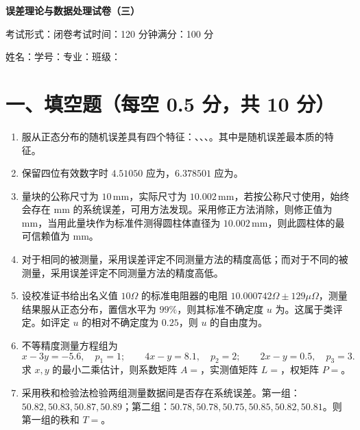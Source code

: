 \documentclass[UTF8,12pt,a4paper]{ctexart}
\newcommand{\blank}[1][2.4cm]{\underline{\hspace{#1}}}
\begin{document}
\begin{center}
    {\bfseries 误差理论与数据处理试卷（三）}\par
    \vspace{0.8em}
    考试形式：闭卷\quad 考试时间：120 分钟\quad 满分：100 分
\end{center}
\vspace{0.3em}
\noindent 姓名：\blank[2cm]\quad 学号：\blank[2.5cm]\quad 专业：\blank[2.5cm]\quad 班级：\blank[2cm]
\vspace{0.6em}

\section*{一、填空题（每空 0.5 分，共 10 分）}
\begin{enumerate}[label=\arabic*、]
\item 服从正态分布的随机误差具有四个特征：\blank[1.8cm]、\blank[1.8cm]、\blank[1.8cm]、\blank[1.8cm]。其中\blank[1.8cm]是随机误差最本质的特征。
\item 保留四位有效数字时 $4.51050$ 应为\blank[1.6cm]，$6.378501$ 应为\blank[1.6cm]。
\item 量块的公称尺寸为 $10\,\mathrm{mm}$，实际尺寸为 $10.002\,\mathrm{mm}$，若按公称尺寸使用，始终会存在\blank[1.6cm] $\mathrm{mm}$ 的系统误差，可用\blank[1.8cm]方法发现。采用修正方法消除，则修正值为\blank[1.6cm] $\mathrm{mm}$，当用此量块作为标准件测得圆柱体直径为 $10.002\,\mathrm{mm}$，则此圆柱体的最可信赖值为\blank[1.6cm] $\mathrm{mm}$。
\item 对于相同的被测量，采用\blank[1.5cm]误差评定不同测量方法的精度高低；而对于不同的被测量，采用\blank[1.5cm]误差评定不同测量方法的精度高低。
\item 设校准证书给出名义值 $10\Omega$ 的标准电阻器的电阻 $10.000742\Omega\pm129\mu\Omega$，测量结果服从正态分布，置信水平为 $99\%$，则其标准不确定度 $u$ 为\blank[1.8cm]。这属于\blank[1cm]类评定。如评定 $u$ 的相对不确定度为 $0.25$，则 $u$ 的自由度为\blank[1cm]。
\item 不等精度测量方程组为
\begin{equation*}
    x-3y=-5.6,\quad p_1=1;\qquad
    4x-y=8.1,\quad p_2=2;\qquad
    2x-y=0.5,\quad p_3=3.
\end{equation*}
求 $x,y$ 的最小二乘估计，则系数矩阵 $A=$\blank[2.4cm]，实测值矩阵 $L=$\blank[2.4cm]，权矩阵 $P=$\blank[2.4cm]。
\item 采用秩和检验法检验两组测量数据间是否存在系统误差。第一组：$50.82,50.83,50.87,50.89$；第二组：$50.78,50.78,50.75,50.85,50.82,50.81$。则第一组的秩和 $T=$\blank[1.5cm]。
\end{enumerate}
\end{document}
